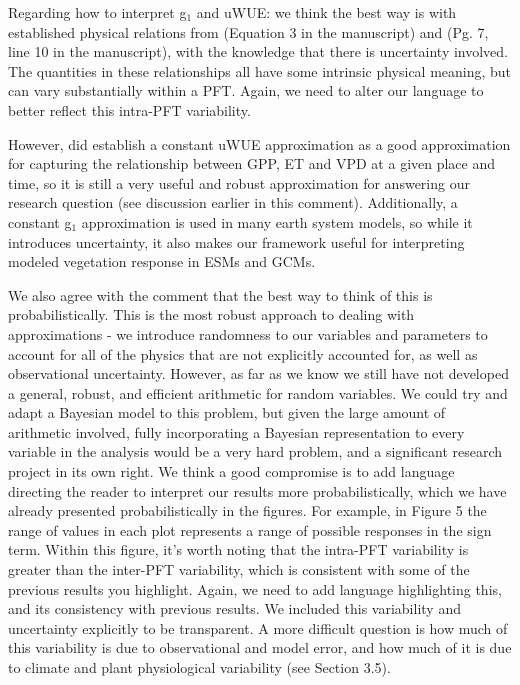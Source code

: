 Regarding how to interpret g$_1$ and uWUE: we think the best way
is with established physical relations from \cite{MEDLYN_2011}
(Equation 3 in the manuscript) and \cite{Zhou_2014} (Pg. 7, line 10 in
the manuscript), with the knowledge that there is uncertainty
involved. The quantities in these relationships all have some
intrinsic physical meaning, but can vary substantially within a
PFT. Again, we need to alter our language to better reflect this
intra-PFT variability.

However, \cite{Zhou_2014} did establish a constant uWUE approximation
as a good approximation for capturing the relationship between GPP, ET
and VPD at a given place and time, so it is still a very useful and
robust approximation for answering our research question (see
discussion earlier in this comment). Additionally, a constant g$_1$
approximation is used in many earth system models, so while it
introduces uncertainty, it also makes our framework
useful for interpreting modeled vegetation response in ESMs and GCMs.

We also agree with the comment that the best way to think of this is
probabilistically. This is the most robust approach to dealing with
approximations - we introduce randomness to our variables and
parameters to account for all of the physics that are not explicitly
accounted for, as well as observational uncertainty. However, as far
as we know we still have not developed a general, robust, and efficient
arithmetic for random variables. We could try and adapt a Bayesian
model to this problem, but given the large amount of arithmetic
involved, fully incorporating a Bayesian representation to every
variable in the analysis would be a very hard problem, and a
significant research project in its own right. We think a good
compromise is to add language directing the reader to interpret our
results more probabilistically, which we have already presented
probabilistically in the figures. For example, in Figure 5 the range of
values in each plot represents a range of possible responses in the
sign term. Within this figure, it's worth noting that the intra-PFT
variability is greater than the inter-PFT variability, which is
consistent with some of the previous results you highlight. Again, we
need to add language highlighting this, and its consistency with
previous results. We included this variability and uncertainty
explicitly to be transparent. A more difficult question is how much of
this variability is due to observational and model error, and how much
of it is due to climate and plant physiological variability (see
Section 3.5).

